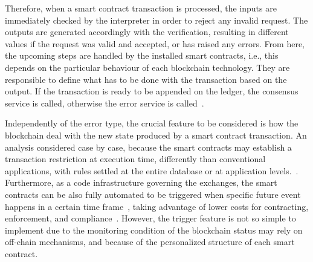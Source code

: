 Therefore, when a smart contract transaction is processed, the inputs are immediately checked by the interpreter in order to reject any invalid request.
The outputs are generated accordingly with the verification, resulting in different values if the request was valid and accepted, or has raised any errors.
From here, the upcoming steps are handled by the installed smart contracts, i.e., this depends on the particular behaviour of each blockchain technology.
They are responsible to define what has to be done with the transaction based on the output.
If the transaction is ready to be appended on the ledger, the consensus service is called,
otherwise the error service is called~\cite{hyper2}.

Independently of the error type, the crucial feature to be considered is how the blockchain deal with the new state produced by a smart contract transaction.
An analysis considered case by case, because the smart contracts may establish a transaction restriction at execution time, differently than conventional applications, with rules settled at the entire database or at application levels.~\cite{itu2017}.
Furthermore, as a code infrastructure governing the exchanges, the smart contracts can be also fully automated to be triggered when specific future event happens in a certain time frame~\cite{swan2015blockchain, xu2017},
taking advantage of lower costs for contracting, enforcement, and compliance~\cite{itu2017}.
However, the trigger feature is not so simple to implement due to the monitoring condition of the blockchain status may rely on off-chain mechanisms, and because of the personalized structure of each smart contract.


